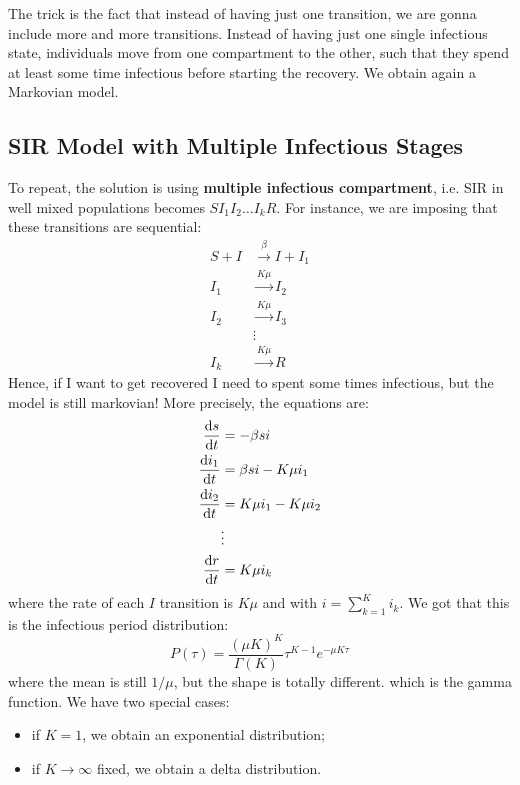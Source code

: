 \documentclass[../main/main.tex]{subfiles}
\begin{document}
The trick is the fact that instead of having just one transition, we are gonna include more and more transitions. Instead of having just one single infectious state, individuals move from one  compartment to the other, such that they spend at least some time infectious before starting the recovery. We obtain again a Markovian model.

\subsection{SIR Model with Multiple Infectious Stages}

To repeat, the solution is using \textbf{multiple infectious compartment}, i.e. SIR in well mixed populations becomes \( S I_1 I_2 \dots I_k R \). For instance, we are imposing that these transitions are sequential:
\begin{equation}
\begin{split}
  S + I & \overset{\beta }{\rightarrow } I + I_1   \\
  I_1 & \overset{K \mu  }{\rightarrow } I_2 \\
   I_2 & \overset{K \mu  }{\rightarrow } I_3 \\
   & \vdots \\
   I_k & \overset{K \mu  }{\rightarrow } R
\end{split}
\end{equation}
Hence, if I want to get recovered I need to spent some times infectious, but the model is still markovian! More precisely, the equations are:
\begin{equation}
\begin{split}
  \dv{s}{t} &= - \beta s i  \\
  \dv{i_1}{t} &= \beta s i - K \mu i_1 \\
  \dv{i_2}{t} &= K \mu i_1 - K \mu i_2 \\
  &\vdots \\
  \dv{r}{t} &= K \mu i_k
\end{split}
\end{equation}
where the rate of each \( I \) transition is \( K \mu  \) and with \( i = \sum_{k=1}^{K} i_k   \).
We got that this is the infectious period distribution:
\begin{equation}
  P(\tau ) = \frac{(\mu K)^K}{\Gamma (K)} \tau ^{K-1} e^{- \mu K \tau }
\end{equation}
where the mean is still \( 1/ \mu  \), but the shape is totally different.
which is the gamma function.
We have two special cases:
\begin{itemize}
\item if \( K=1 \), we obtain an exponential distribution;
\item if \( K \rightarrow \infty  \) fixed, we obtain a delta distribution.
\end{itemize}
\end{document}
